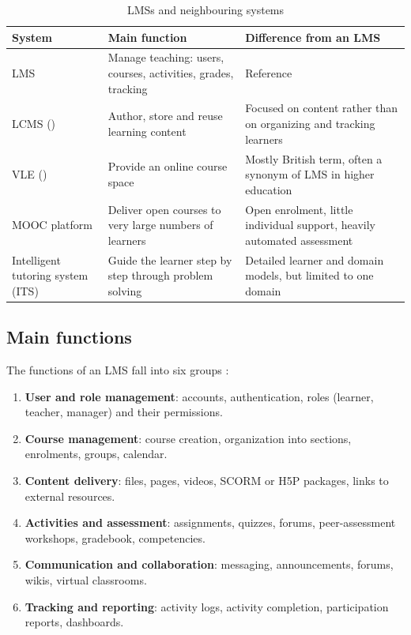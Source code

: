 \begin{table}[htbp]
\centering
\caption{LMSs and neighbouring systems}
\label{tab-lms-neighbours}
\begin{tabularx}{\textwidth}{@{}L{3.2cm}YY@{}}
\toprule
\textbf{System} & \textbf{Main function} & \textbf{Difference from an LMS} \\
\midrule
LMS & Manage teaching: users, courses, activities, grades, tracking &
  Reference \\
LCMS () & Author, store and
  reuse learning content & Focused on content rather than on organizing
  and tracking learners \\
VLE () & Provide an online course
  space & Mostly British term, often a synonym of LMS in higher
  education \\
MOOC platform & Deliver open courses to very large numbers of learners &
  Open enrolment, little individual support, heavily automated
  assessment \\
Intelligent tutoring system (ITS) & Guide the learner step by step through
  problem solving & Detailed learner and domain models, but limited to one
  domain \\
\bottomrule
\end{tabularx}
\end{table}

\subsection{Main functions}

The functions of an LMS fall into six groups \cite{ellis2009,dobre2015}:

\begin{enumerate}
  \item \textbf{User and role management}: accounts, authentication, roles
        (learner, teacher, manager) and their permissions.
  \item \textbf{Course management}: course creation, organization into
        sections, enrolments, groups, calendar.
  \item \textbf{Content delivery}: files, pages, videos, SCORM or H5P
        packages, links to external resources.
  \item \textbf{Activities and assessment}: assignments, quizzes, forums,
        peer-assessment workshops, gradebook, competencies.
  \item \textbf{Communication and collaboration}: messaging,
        announcements, forums, wikis, virtual classrooms.
  \item \textbf{Tracking and reporting}: activity logs, activity
        completion, participation reports, dashboards.
\end{enumerate}

